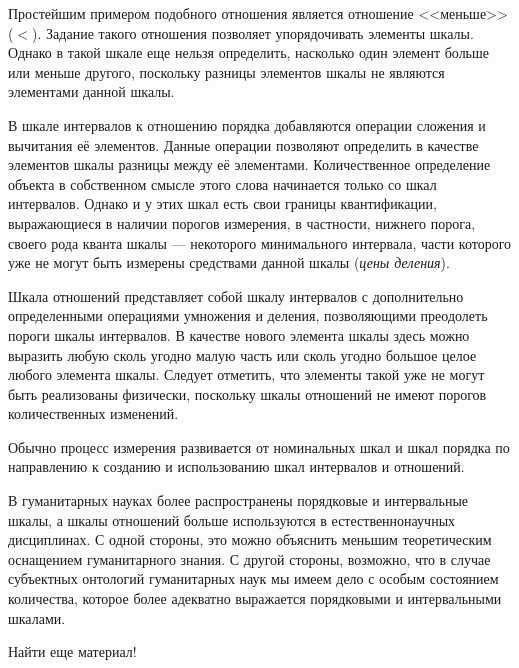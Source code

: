 Простейшим примером подобного отношения является отношение <<меньше>> (\( < \)).
Задание такого отношения позволяет упорядочивать элементы шкалы.
Однако в такой шкале еще нельзя определить, насколько один элемент больше или меньше другого,
поскольку разницы элементов шкалы не являются элементами данной шкалы.

В шкале интервалов к отношению порядка добавляются операции сложения и вычитания
её элементов. Данные операции позволяют определить в качестве элементов шкалы
разницы между её элементами.
Количественное определение объекта в собственном смысле этого слова начинается только
со шкал интервалов. Однако и у этих шкал есть свои границы квантификации,
выражающиеся в наличии порогов измерения, в частности, нижнего порога,
своего рода кванта шкалы --- некоторого минимального интервала,
части которого уже не могут быть измерены средствами данной шкалы (\emph{цены деления}).

Шкала отношений представляет собой шкалу интервалов с дополнительно определенными
операциями умножения и деления, позволяющими преодолеть пороги шкалы интервалов.
В качестве нового элемента шкалы здесь можно выразить любую сколь угодно малую часть
или сколь угодно большое целое любого элемента шкалы.
Следует отметить, что элементы такой уже не могут быть реализованы физически,
поскольку шкалы отношений не имеют порогов количественных изменений.

Обычно процесс измерения развивается от номинальных шкал и шкал порядка по направлению
к созданию и использованию шкал интервалов и отношений.

В гуманитарных науках более распространены порядковые и интервальные шкалы,
а шкалы отношений больше используются в естественнонаучных дисциплинах.
С одной стороны, это можно объяснить меньшим теоретическим оснащением гуманитарного знания.
С другой стороны, возможно, что в случае субъектных онтологий гуманитарных наук мы имеем дело
с особым состоянием количества, которое более адекватно выражается порядковыми и интервальными шкалами.

{\color{red} Найти еще материал!}
%

\pagebreak